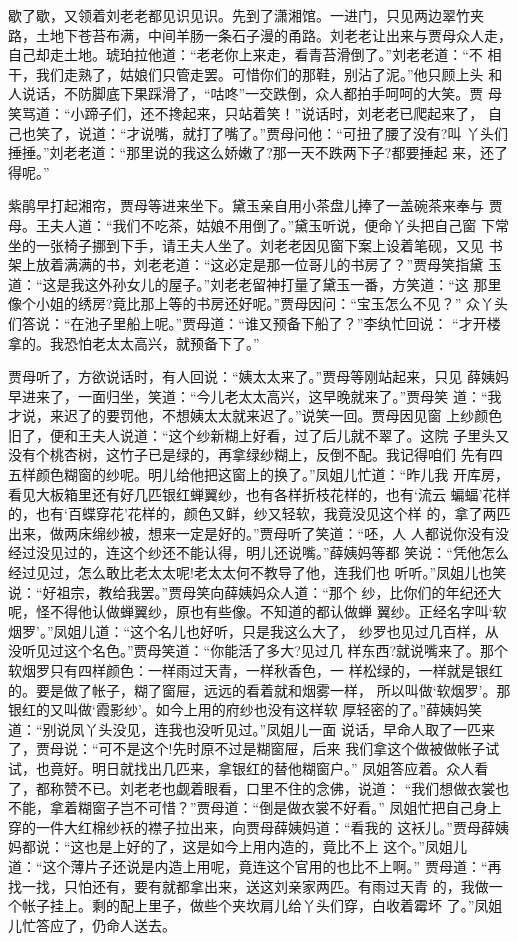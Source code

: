 歇了歇，又领着刘老老都见识见识。先到了潇湘馆。一进门，只见两边翠竹夹
路，土地下苍苔布满，中间羊肠一条石子漫的甬路。刘老老让出来与贾母众人走，
自己却走土地。琥珀拉他道：“老老你上来走，看青苔滑倒了。”刘老老道：“不
相干，我们走熟了，姑娘们只管走罢。可惜你们的那鞋，别沾了泥。”他只顾上头
和人说话，不防脚底下果踩滑了，“咕咚”一交跌倒，众人都拍手呵呵的大笑。贾
母笑骂道：“小蹄子们，还不搀起来，只站着笑！”说话时，刘老老已爬起来了，
自己也笑了，说道：“才说嘴，就打了嘴了。”贾母问他：“可扭了腰了没有?叫
丫头们捶捶。”刘老老道：“那里说的我这么娇嫩了?那一天不跌两下子?都要捶起
来，还了得呢。”

紫鹃早打起湘帘，贾母等进来坐下。黛玉亲自用小茶盘儿捧了一盖碗茶来奉与
贾母。王夫人道：“我们不吃茶，姑娘不用倒了。”黛玉听说，便命丫头把自己窗
下常坐的一张椅子挪到下手，请王夫人坐了。刘老老因见窗下案上设着笔砚，又见
书架上放着满满的书，刘老老道：“这必定是那一位哥儿的书房了？”贾母笑指黛
玉道：“这是我这外孙女儿的屋子。”刘老老留神打量了黛玉一番，方笑道：“这
那里像个小姐的绣房?竟比那上等的书房还好呢。”贾母因问：“宝玉怎么不见？”
众丫头们答说：“在池子里船上呢。”贾母道：“谁又预备下船了？”李纨忙回说：
“才开楼拿的。我恐怕老太太高兴，就预备下了。”

贾母听了，方欲说话时，有人回说：“姨太太来了。”贾母等刚站起来，只见
薛姨妈早进来了，一面归坐，笑道：“今儿老太太高兴，这早晚就来了。”贾母笑
道：“我才说，来迟了的要罚他，不想姨太太就来迟了。”说笑一回。贾母因见窗
上纱颜色旧了，便和王夫人说道：“这个纱新糊上好看，过了后儿就不翠了。这院
子里头又没有个桃杏树，这竹子已是绿的，再拿绿纱糊上，反倒不配。我记得咱们
先有四五样颜色糊窗的纱呢。明儿给他把这窗上的换了。”凤姐儿忙道：“昨儿我
开库房，看见大板箱里还有好几匹银红蝉翼纱，也有各样折枝花样的，也有‘流云
蝙蝠’花样的，也有‘百蝶穿花’花样的，颜色又鲜，纱又轻软，我竟没见这个样
的，拿了两匹出来，做两床绵纱被，想来一定是好的。”贾母听了笑道：“呸，人
人都说你没有没经过没见过的，连这个纱还不能认得，明儿还说嘴。”薛姨妈等都
笑说：“凭他怎么经过见过，怎么敢比老太太呢!老太太何不教导了他，连我们也
听听。”凤姐儿也笑说：“好祖宗，教给我罢。”贾母笑向薛姨妈众人道：“那个
纱，比你们的年纪还大呢，怪不得他认做蝉翼纱，原也有些像。不知道的都认做蝉
翼纱。正经名字叫‘软烟罗’。”凤姐儿道：“这个名儿也好听，只是我这么大了，
纱罗也见过几百样，从没听见过这个名色。”贾母笑道：“你能活了多大?见过几
样东西?就说嘴来了。那个软烟罗只有四样颜色：一样雨过天青，一样秋香色，一
样松绿的，一样就是银红的。要是做了帐子，糊了窗屉，远远的看着就和烟雾一样，
所以叫做‘软烟罗’。那银红的又叫做‘霞影纱’。如今上用的府纱也没有这样软
厚轻密的了。”薛姨妈笑道：“别说凤丫头没见，连我也没听见过。”凤姐儿一面
说话，早命人取了一匹来了，贾母说：“可不是这个!先时原不过是糊窗屉，后来
我们拿这个做被做帐子试试，也竟好。明日就找出几匹来，拿银红的替他糊窗户。”
凤姐答应着。众人看了，都称赞不已。刘老老也觑着眼看，口里不住的念佛，说道：
“我们想做衣裳也不能，拿着糊窗子岂不可惜？”贾母道：“倒是做衣裳不好看。”
凤姐忙把自己身上穿的一件大红棉纱袄的襟子拉出来，向贾母薛姨妈道：“看我的
这袄儿。”贾母薛姨妈都说：“这也是上好的了，这是如今上用内造的，竟比不上
这个。”凤姐儿道：“这个薄片子还说是内造上用呢，竟连这个官用的也比不上啊。”
贾母道：“再找一找，只怕还有，要有就都拿出来，送这刘亲家两匹。有雨过天青
的，我做一个帐子挂上。剩的配上里子，做些个夹坎肩儿给丫头们穿，白收着霉坏
了。”凤姐儿忙答应了，仍命人送去。


